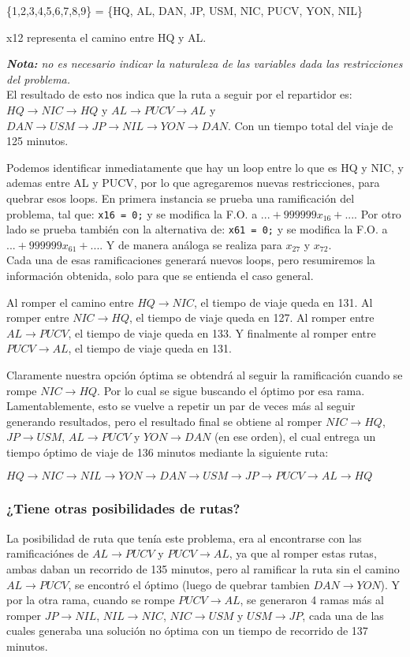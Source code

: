 \documentclass[12pt,letterpaper]{article}
\begin{document}
\{1,2,3,4,5,6,7,8,9\} = \{HQ, AL, DAN, JP, USM, NIC, PUCV, YON, NIL\}

x12 representa el camino entre HQ y AL.

\textit{\textbf{Nota:} no es necesario indicar la naturaleza de las variables dada las restricciones del problema.}
\\

El resultado de esto nos indica que la ruta a seguir por el repartidor es:
$HQ \to  NIC \to HQ$ y $AL \to PUCV \to AL$ y $DAN \to USM \to JP \to NIL \to YON \to DAN$. Con un tiempo total del viaje
de 125 minutos.

Podemos identificar inmediatamente que hay un loop entre lo que es HQ y NIC, y ademas entre AL y PUCV, por lo que agregaremos nuevas restricciones, para quebrar esos loops. En primera instancia se prueba una ramificación del problema, tal que: \verb+x16 = 0;+ y se modifica la F.O. a $... + 999999 x_{16} + ...$. Por otro lado se prueba también con la alternativa de: \verb+x61 = 0;+ y se modifica la F.O. a $... + 999999 x_{61} + ...$. Y de manera análoga se realiza para $x_{27}$ y $x_{72}$.
\\

Cada una de esas ramificaciones generará nuevos loops, pero resumiremos la información obtenida, solo para que se entienda el caso general.

Al romper el camino entre $HQ \to NIC$, el tiempo de viaje queda en 131. Al romper entre $NIC \to HQ$, el tiempo de viaje queda en 127. Al romper entre $AL \to PUCV$, el tiempo de viaje queda en 133. Y finalmente al romper entre $PUCV \to AL$, el tiempo de viaje queda en 131.

Claramente nuestra opción óptima se obtendrá al seguir la ramificación cuando se rompe $NIC \to HQ$. Por lo cual se sigue buscando el óptimo por esa rama.
Lamentablemente, esto se vuelve a repetir un par de veces más al seguir generando resultados, pero el resultado final se obtiene al romper $NIC \to HQ$, $JP \to USM$, $AL \to PUCV$ y $YON \to DAN$ (en ese orden), el cual entrega un tiempo óptimo de viaje de 136 minutos mediante la siguiente ruta:

\begin{center}$HQ \to NIC \to NIL \to YON \to DAN \to USM \to JP \to PUCV \to AL \to HQ$\end{center}

\subsubsection{¿Tiene otras posibilidades de rutas?}
La posibilidad de ruta que tenía este problema, era al encontrarse con las ramificaciónes de $AL \to PUCV$ y $PUCV \to AL$, ya que al romper estas rutas, ambas daban un recorrido de 135 minutos, pero al ramificar la ruta sin el camino $AL \to PUCV$, se encontró el óptimo (luego de quebrar tambien $DAN \to YON$). Y por la otra rama, cuando se rompe $PUCV \to AL$, se generaron 4 ramas más al romper $JP \to NIL$, $NIL \to NIC$, $NIC \to USM$ y $USM \to JP$, cada una de las cuales generaba una solución no óptima con un tiempo de recorrido de 137 minutos.
\end{document}
